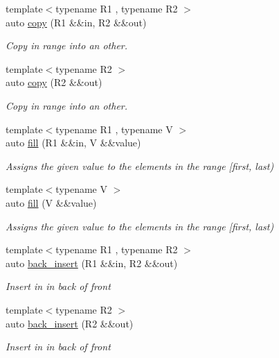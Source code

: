 \begin{DoxyCompactItemize}
{\footnotesize template$<$typename R1 , typename R2 $>$ }\\auto \mbox{\hyperlink{namespacerah_a1d0f36ff683cedc9090956ea389b3312}{copy}} (R1 \&\&in, R2 \&\&out)
\begin{DoxyCompactList}\small\item\em Copy in range into an other. \end{DoxyCompactList}\item 
{\footnotesize template$<$typename R2 $>$ }\\auto \mbox{\hyperlink{namespacerah_ab3873d79b7f878223f24062ba562eba9}{copy}} (R2 \&\&out)
\begin{DoxyCompactList}\small\item\em Copy in range into an other. \end{DoxyCompactList}\item 
{\footnotesize template$<$typename R1 , typename V $>$ }\\auto \mbox{\hyperlink{namespacerah_ad6edf0b665289e26018fa3457e25cd6c}{fill}} (R1 \&\&in, V \&\&value)
\begin{DoxyCompactList}\small\item\em Assigns the given value to the elements in the range \mbox{[}first, last) \end{DoxyCompactList}\item 
{\footnotesize template$<$typename V $>$ }\\auto \mbox{\hyperlink{namespacerah_a4dc470cd5701a27ad3388c1b1d07d705}{fill}} (V \&\&value)
\begin{DoxyCompactList}\small\item\em Assigns the given value to the elements in the range \mbox{[}first, last) \end{DoxyCompactList}\item 
{\footnotesize template$<$typename R1 , typename R2 $>$ }\\auto \mbox{\hyperlink{namespacerah_a2734b7f57efb773c6df8ac55b9d040cd}{back\+\_\+insert}} (R1 \&\&in, R2 \&\&out)
\begin{DoxyCompactList}\small\item\em Insert {\itshape in} in back of {\itshape front} \end{DoxyCompactList}\item 
{\footnotesize template$<$typename R2 $>$ }\\auto \mbox{\hyperlink{namespacerah_a1c3ab6d88fc54b3638ef699d465e86b4}{back\+\_\+insert}} (R2 \&\&out)
\begin{DoxyCompactList}\small\item\em Insert {\itshape in} in back of {\itshape front} \end{DoxyCompactList}\item 

\end{DoxyCompactItemize}

